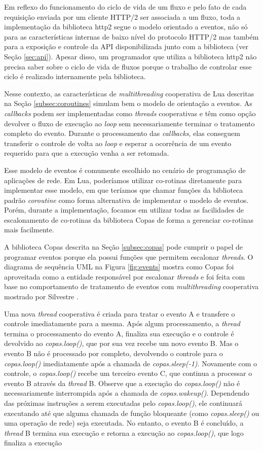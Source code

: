 Em reflexo do funcionamento do ciclo de vida de um fluxo e pelo fato de cada requisição enviada por um cliente HTTP/2 ser associada a um fluxo, toda a implementação da biblioteca http2 segue o modelo orientado a eventos, não só para as características internas de baixo nível do protocolo HTTP/2 mas também para a exposição e controle da API disponibilizada junto com a biblioteca (ver Seção \ref{sec:api}). Apesar disso, um programador que utiliza a biblioteca http2 não precisa saber sobre o ciclo de vida de fluxos porque o trabalho de controlar esse ciclo é realizado internamente pela biblioteca.

Nesse contexto, as características de {\em multithreading} cooperativa de Lua descritas na Seção \ref{subsec:coroutines} simulam bem o modelo de orientação a eventos. As {\em callbacks} podem ser implementadas como {\em threads} cooperativas e têm como opção devolver o fluxo de execução ao {\em loop} sem necessariamente terminar o tratamento completo do evento. Durante o processamento das {\em callbacks}, elas conseguem transferir o controle de volta ao {\em loop} e esperar a ocorrência de um evento requerido para que a execução venha a ser retomada.

Esse modelo de eventos é comumente escolhido no cenário de programação de aplicações de rede. Em Lua, poderíamos utilizar co-rotinas diretamente para implementar esse modelo, em que teríamos que chamar funções da biblioteca padrão {\em coroutine} como forma alternativa de implementar o modelo de eventos. Porém, durante a implementação, focamos em utilizar todas as facilidades de escalonamento de co-rotinas da biblioteca Copas \cite{Copas} de forma a gerenciar co-rotinas mais facilmente.

A biblioteca Copas descrita na Seção \ref{subsec:copas} pode cumprir o papel de programar eventos porque ela possui funções que permitem escalonar {\em threads}. O diagrama de sequência UML na Figura \ref{fig:events} mostra como Copas foi aproveitada como a entidade responsável por escalonar {\em threads} e foi feita com base no comportamento de tratamento de eventos com {\em multithreading} cooperativa mostrado por Silvestre \cite{silvestre2009modelos}.

Uma nova {\em thread} cooperativa é criada para tratar o evento A e transfere o controle imediatamente para a mesma. Após algum processamento, a {\em thread} termina o processamento do evento A, finaliza sua execução e o controle é devolvido ao {\em copas.loop()}, que por sua vez recebe um novo evento B. Mas o evento B não é processado por completo, devolvendo o controle para o {\em copas.loop()} imediatamente após a chamada de {\em copas.sleep(-1)}. Novamente com o controle, o {\em copas.loop()} recebe um terceiro evento C, que continua a processar o evento B através da {\em thread} B. Observe que a execução do {\em copas.loop()} não é necessariamente interrompida após a chamada de {\em copas.wakeup()}. Dependendo das próximas instruções a serem executadas pelo {\em copas.loop()}, ele continuará executando até que alguma chamada de função bloqueante (como {\em copas.sleep()} ou uma operação de rede) seja executada. No entanto, o evento B é concluído, a {\em thread} B termina sua execução e retorna a execução ao {\em copas.loop()}, que logo finaliza a execução 

